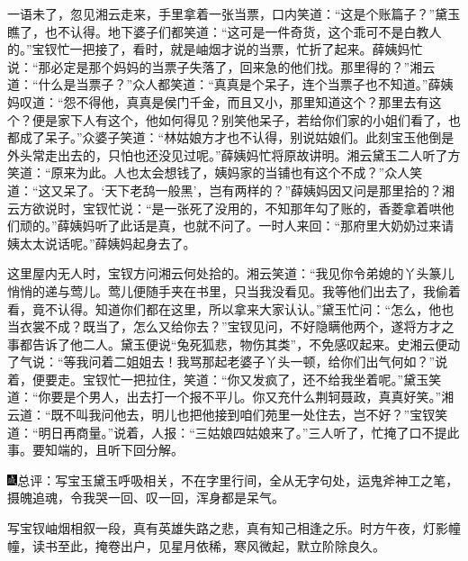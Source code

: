 一语未了，忽见湘云走来，手里拿着一张当票，口内笑道：``这是个账篇子？''黛玉瞧了，也不认得。地下婆子们都笑道：``这可是一件奇货，这个乖可不是白教人的。''宝钗忙一把接了，看时，就是岫烟才说的当票，忙折了起来。薛姨妈忙说：``那必定是那个妈妈的当票子失落了，回来急的他们找。那里得的？''湘云道：``什么是当票子？''众人都笑道：``真真是个呆子，连个当票子也不知道。''薛姨妈叹道：``怨不得他，真真是侯门千金，而且又小，那里知道这个？那里去有这个？便是家下人有这个，他如何得见？别笑他呆子，若给你们家的小姐们看了，也都成了呆子。''众婆子笑道：``林姑娘方才也不认得，别说姑娘们。此刻宝玉他倒是外头常走出去的，只怕也还没见过呢。''薛姨妈忙将原故讲明。湘云黛玉二人听了方笑道：``原来为此。人也太会想钱了，姨妈家的当铺也有这个不成？''众人笑道：``这又呆了。`天下老鸹一般黑'，岂有两样的？''薛姨妈因又问是那里拾的？湘云方欲说时，宝钗忙说：``是一张死了没用的，不知那年勾了账的，香菱拿着哄他们顽的。''薛姨妈听了此话是真，也就不问了。一时人来回：``那府里大奶奶过来请姨太太说话呢。''薛姨妈起身去了。

这里屋内无人时，宝钗方问湘云何处拾的。湘云笑道：``我见你令弟媳的丫头篆儿悄悄的递与莺儿。莺儿便随手夹在书里，只当我没看见。我等他们出去了，我偷着看，竟不认得。知道你们都在这里，所以拿来大家认认。''黛玉忙问：``怎么，他也当衣裳不成？既当了，怎么又给你去？''宝钗见问，不好隐瞒他两个，遂将方才之事都告诉了他二人。黛玉便说``兔死狐悲，物伤其类''，不免感叹起来。史湘云便动了气说：``等我问着二姐姐去！我骂那起老婆子丫头一顿，给你们出气何如？''说着，便要走。宝钗忙一把拉住，笑道：``你又发疯了，还不给我坐着呢。''黛玉笑道：``你要是个男人，出去打一个报不平儿。你又充什么荆轲聂政，真真好笑。''湘云道：``既不叫我问他去，明儿也把他接到咱们苑里一处住去，岂不好？''宝钗笑道：``明日再商量。''说着，人报：``三姑娘四姑娘来了。''三人听了，忙掩了口不提此事。要知端的，且听下回分解。

{\includegraphics[width=3mm]{../Images/00005}总评：写宝玉黛玉呼吸相关，不在字里行间，全从无字句处，运鬼斧神工之笔，摄魄追魂，令我哭一回、叹一回，浑身都是呆气。}

{写宝钗岫烟相叙一段，真有英雄失路之悲，真有知己相逢之乐。时方午夜，灯影幢幢，读书至此，掩卷出户，见星月依稀，寒风微起，默立阶除良久。}

